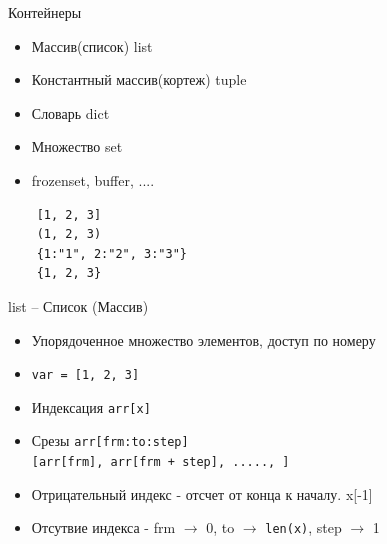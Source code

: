 \documentclass{article}
\begin{document}
\LARGE

\begin{center} Контейнеры \end{center}
\begin{itemize}
	\item Массив(список) list
	\item Константный массив(кортеж) tuple
	\item Словарь dict
	\item Множество set
	\item frozenset, buffer, ....
\end{itemize}
\begin{lstlisting}
	[1, 2, 3]
	(1, 2, 3)
	{1:"1", 2:"2", 3:"3"}
	{1, 2, 3}
\end{lstlisting}
\newpage

\begin{center} list – Список (Массив) \end{center}
\begin{itemize}
	\item Упорядоченное множество элементов, доступ по номеру
	\item \lstinline!var = [1, 2, 3]!
	\item Индексация \lstinline!arr[x]!
	\item Срезы
			\lstinline!arr[frm:to:step]! \\
			\lstinline![arr[frm], arr[frm + step], ....., ]!
	\item Отрицательный индекс - отсчет от конца к началу. x[-1]
	\item Отсутвие индекса - frm $\rightarrow$ 0, to $\rightarrow$ \lstinline!len(x)!,
	        step $\rightarrow$ 1
\end{itemize}
\newpage
\end{document}
